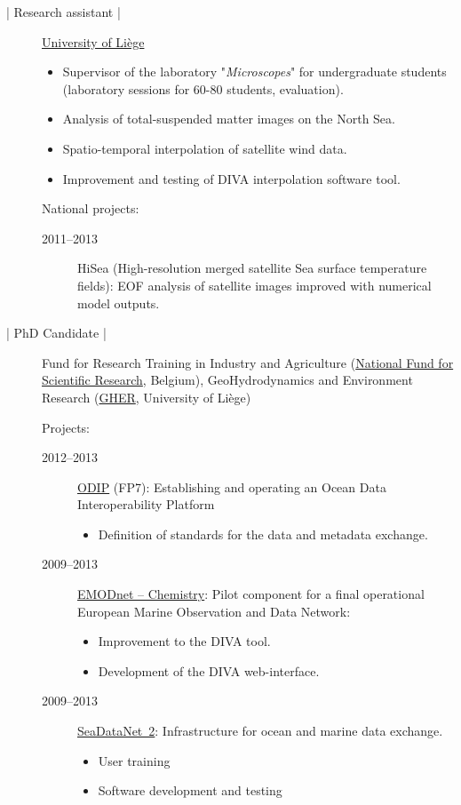 \documentclass[10pt,a4paper,svgnames]{article}
\begin{document}
\begin{description}
\item[ | Research assistant |] \href{www.ulg.ac.be}{University of Li\`{e}ge}
\begin{itemize}%
\item Supervisor of the laboratory "\textit{Microscopes}" for undergraduate students\\ (laboratory sessions for 60-80 students, evaluation).
\item Analysis of total-suspended matter images on the North Sea.
\item Spatio-temporal interpolation of satellite wind data.
\item Improvement and testing of DIVA interpolation software tool.
\end{itemize}

National projects:
\begin{description}
\item[2011--2013] HiSea (High-resolution merged satellite Sea surface temperature fields): EOF analysis of satellite images improved with numerical model outputs.
\end{description}

\item[ | PhD Candidate |] Fund for Research Training in Industry and Agriculture (\href{https://www.fnrs.be}{National Fund for Scientific Research}, Belgium), GeoHydrodynamics and Environment Research (\href{http://modb.oce.ulg.ac.be/}{GHER}, University of Li\`{e}ge)

Projects:
\begin{description}

\item[2012--2013] \href{http://www.odip.eu/}{ODIP} (FP7): Establishing and operating an Ocean Data Interoperability Platform
\begin{itemize}
\item Definition of standards for the data and metadata exchange.
\end{itemize}
\item[2009--2013] \href{https://www.emodnet-chemistry.eu}{EMODnet -- Chemistry}: Pilot component for a final operational European Marine Observation and Data Network:
\begin{itemize}
\item Improvement to the DIVA tool.
\item Development of the DIVA web-interface.
\end{itemize}

\item[2009--2013] \href{https://www.seadatanet.org}{SeaDataNet~2}: Infrastructure for ocean and marine data exchange.
\begin{itemize}
\item User training
\item Software development and testing
\end{itemize}


\end{description}
\end{description}
\end{document}
